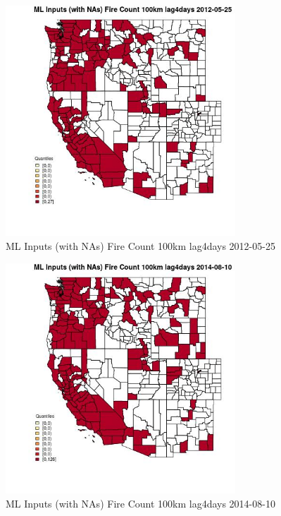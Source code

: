 \begin{figure} 
\centering  
\includegraphics[width=0.77\textwidth]{Code_Outputs/Report_ML_input_PM25_Step4_part_e_de_duplicated_aves_compiled_2019-05-18wNAs_CountyFire_Count_100km_lag4daysMean2012-05-25_2012-05-25.jpg} 
\caption{\label{fig:Report_ML_input_PM25_Step4_part_e_de_duplicated_aves_compiled_2019-05-18wNAsCountyFire_Count_100km_lag4daysMean2012-05-25_2012-05-25}ML Inputs (with NAs) Fire Count 100km lag4days 2012-05-25} 
\end{figure} 
 

\begin{figure} 
\centering  
\includegraphics[width=0.77\textwidth]{Code_Outputs/Report_ML_input_PM25_Step4_part_e_de_duplicated_aves_compiled_2019-05-18wNAs_CountyFire_Count_100km_lag4daysMean2014-08-10_2014-08-10.jpg} 
\caption{\label{fig:Report_ML_input_PM25_Step4_part_e_de_duplicated_aves_compiled_2019-05-18wNAsCountyFire_Count_100km_lag4daysMean2014-08-10_2014-08-10}ML Inputs (with NAs) Fire Count 100km lag4days 2014-08-10} 
\end{figure} 
 

